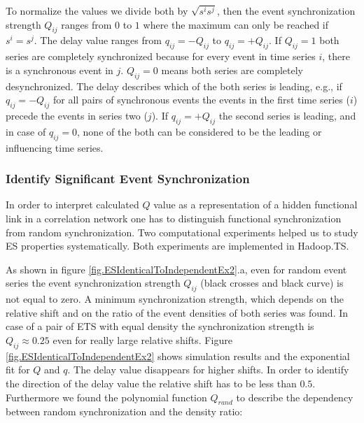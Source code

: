 \documentclass[a4paper,10pt]{scrbook}
\begin{document}
To normalize the values we divide both by $\sqrt{s^i s^j}$, then the event synchronization strength $Q_{ij}$ ranges from $0$ to $1$ where the maximum can only be reached if $s^i=s^j$. The delay value ranges from $q_{ij}=-Q_{ij}$ to $q_{ij}=+Q_{ij}$. If $Q_{ij}=1$ both series are completely synchronized because for every event in time series $i$, there is a synchronous event in $j$. $Q_{ij}=0$ means both series are completely desynchronized. The delay describes which of the both series is leading, e.g., if $q_{ij}=-Q_{ij}$ for all pairs of synchronous events the events in the first time series ($i$) precede the events in series two ($j$). If $q_{ij}=+Q_{ij}$ the second series is leading, and in case of $q_{ij}=0$, none of the both can be considered to be the leading or influencing time series.

\subsubsection*{Identify Significant Event Synchronization}
In order to interpret calculated $Q$ value as a representation of a hidden functional link in a correlation network one has to distinguish functional synchronization from random synchronization. Two computational experiments helped us to study ES properties systematically. Both experiments are implemented in Hadoop.TS. 

%

\label{ext.fig.ESIdenticalToIndependentEx2} 


As shown in figure \ref{fig.ESIdenticalToIndependentEx2}.a, even for random event series the event synchronization strength  $Q_{ij}$ (black crosses and black curve) is not equal to zero. A minimum synchronization strength, which depends on the relative shift and on the ratio of the event densities of both series was found. In case of a pair of ETS with equal density the synchronization strength is $Q_{ij} \approx 0.25$ even for really large relative shifts. Figure \ref{fig.ESIdenticalToIndependentEx2} shows simulation results and the exponential fit for $Q$ and $q$. The delay value disappears for higher shifts. In order to identify the direction of the delay value the relative shift has to be less than $0.5$. Furthermore we found the polynomial function $Q_{rand}$ to describe the dependency between random synchronization and the density ratio:
\end{document}
